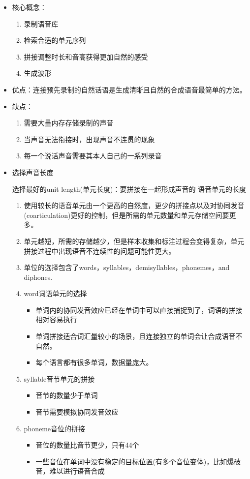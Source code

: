 \documentclass[UTF8]{ctexart}
\begin{document}
\begin{itemize}
    \item 核心概念：
    \begin{enumerate}
        \item 录制语音库
        \item 检索合适的单元序列
        \item 拼接调整时长和音高获得更加自然的感受
        \item 生成波形
    \end{enumerate}
    \item 优点：连接预先录制的自然话语是生成清晰且自然的合成语音最简单的方法。
    \item 缺点：
    \begin{enumerate}
        \item 需要大量内存存储录制的声音
        \item 当声音无法衔接时，出现声音不连贯的现象
        \item 每一个说话声音需要其本人自己的一系列录音
    \end{enumerate}
    \item 选择声音长度
    
    选择最好的unit length(单元长度)：要拼接在一起形成声音的 语音单元的长度
    \begin{enumerate}
        \item 使用较长的语音单元由一个更高的自然度，更少的拼接点以及对协同发音(coarticulation)更好的控制，但是所需的单元数量和单元存储空间要更多。
        \item 单元越短，所需的存储越少，但是样本收集和标注过程会变得复杂，单元拼接过程中出现语音不连续性的问题可能性更大。
        \item 单位的选择包含了words，syllables，demisyllables，phonemes，and diphones.
        \item word词语单元的选择
        \begin{itemize}
            \item 单词内的协同发音效应已经在单词中可以直接捕捉到了，词语的拼接相对容易执行
            \item 单词拼接适合词汇量较小的场景，且连接独立的单词会让合成语音不自然。
            \item 每个语言都有很多单词，数据量庞大。
        \end{itemize}

        \item syllable音节单元的拼接
        \begin{itemize}
            \item 音节的数量少于单词
            \item 音节需要模拟协同发音效应
        \end{itemize}
        \item phoneme音位的拼接
        \begin{itemize}
            \item 音位的数量比音节更少，只有44个
            \item 一些音位在单词中没有稳定的目标位置(有多个音位变体)，比如爆破音，难以进行语音合成
        \end{itemize}


\end{enumerate}
\end{itemize}
\end{document}
